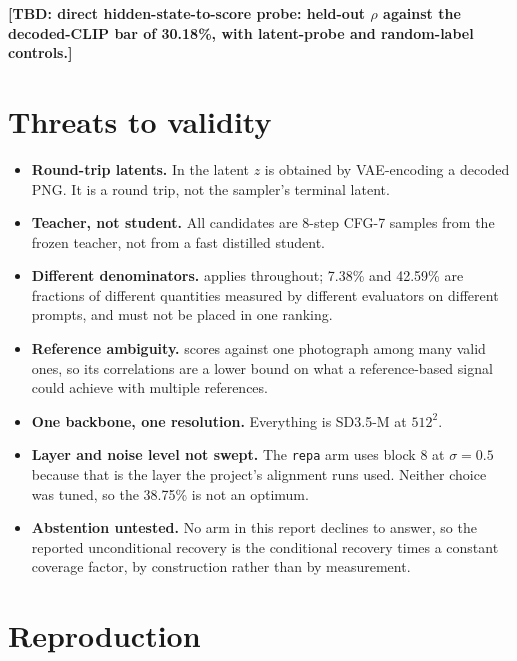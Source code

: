 \documentclass[10pt]{article}
\newcommand{\obs}[1]{\textcolor{observedblue}{#1}}
\newcommand{\tbd}[1]{\textcolor{placeholderred}{\textbf{[TBD: #1]}}}
\begin{document}
\tbd{direct hidden-state-to-score probe: held-out $\rho$ against the decoded-CLIP bar of
\obs{30.18\%}, with latent-probe and random-label controls.}

\section{Threats to validity}
\label{sec:threats}

\begin{itemize}
  \item \textbf{Round-trip latents.} In  the latent $z$ is obtained by VAE-encoding a
    decoded PNG. It is a round trip, not the sampler's terminal latent.
  \item \textbf{Teacher, not student.} All candidates are 8-step CFG-7 samples from the frozen
    teacher, not from a fast distilled student.
  \item \textbf{Different denominators.}  applies throughout; \obs{7.38\%} and
    \obs{42.59\%} are fractions of different quantities measured by different evaluators on different
    prompts, and must not be placed in one ranking.
  \item \textbf{Reference ambiguity.}  scores against one photograph among many
    valid ones, so its correlations are a lower bound on what a reference-based signal could achieve
    with multiple references.
  \item \textbf{One backbone, one resolution.} Everything is SD3.5-M at $512^2$.
  \item \textbf{Layer and noise level not swept.} The \texttt{repa} arm uses block 8 at $\sigma=0.5$
    because that is the layer the project's alignment runs used. Neither choice was tuned, so the
    \obs{38.75\%} is not an optimum.
  \item \textbf{Abstention untested.} No arm in this report declines to answer, so the reported
    unconditional recovery is the conditional recovery times a constant coverage factor, by
    construction rather than by measurement.
\end{itemize}

\section{Reproduction}
\end{document}
